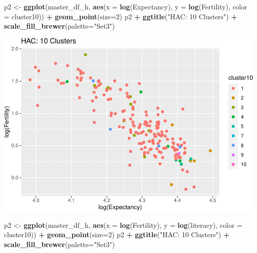 \documentclass[]{article}
\newenvironment{Shaded}{\begin{snugshade}}{\end{snugshade}}
\newcommand{\DataTypeTok}[1]{\textcolor[rgb]{0.13,0.29,0.53}{#1}}
\newcommand{\DecValTok}[1]{\textcolor[rgb]{0.00,0.00,0.81}{#1}}
\newcommand{\KeywordTok}[1]{\textcolor[rgb]{0.13,0.29,0.53}{\textbf{#1}}}
\newcommand{\NormalTok}[1]{#1}
\newcommand{\OperatorTok}[1]{\textcolor[rgb]{0.81,0.36,0.00}{\textbf{#1}}}
\newcommand{\StringTok}[1]{\textcolor[rgb]{0.31,0.60,0.02}{#1}}
\begin{document}
\begin{Shaded}
\begin{Highlighting}[]
\NormalTok{p2 <-}\StringTok{ }\KeywordTok{ggplot}\NormalTok{(master_df_h, }\KeywordTok{aes}\NormalTok{(}\DataTypeTok{x =} \KeywordTok{log}\NormalTok{(Expectancy), }\DataTypeTok{y =} \KeywordTok{log}\NormalTok{(Fertility), }\DataTypeTok{color =}\NormalTok{ cluster10)) }\OperatorTok{+}
\StringTok{  }\KeywordTok{geom_point}\NormalTok{(}\DataTypeTok{size=}\DecValTok{2}\NormalTok{)}
\NormalTok{p2 }\OperatorTok{+}\StringTok{ }\KeywordTok{ggtitle}\NormalTok{(}\StringTok{"HAC: 10 Clusters"}\NormalTok{) }\OperatorTok{+}\StringTok{ }\KeywordTok{scale_fill_brewer}\NormalTok{(}\DataTypeTok{palette=}\StringTok{"Set3"}\NormalTok{)}
\end{Highlighting}
\end{Shaded}

\includegraphics{eda_files/figure-latex/unnamed-chunk-31-9.pdf}

\begin{Shaded}
\begin{Highlighting}[]
\NormalTok{p2 <-}\StringTok{ }\KeywordTok{ggplot}\NormalTok{(master_df_h, }\KeywordTok{aes}\NormalTok{(}\DataTypeTok{x =} \KeywordTok{log}\NormalTok{(Fertility), }\DataTypeTok{y =} \KeywordTok{log}\NormalTok{(literacy), }\DataTypeTok{color =}\NormalTok{ cluster10)) }\OperatorTok{+}
\StringTok{  }\KeywordTok{geom_point}\NormalTok{(}\DataTypeTok{size=}\DecValTok{2}\NormalTok{)}
\NormalTok{p2 }\OperatorTok{+}\StringTok{ }\KeywordTok{ggtitle}\NormalTok{(}\StringTok{"HAC: 10 Clusters"}\NormalTok{) }\OperatorTok{+}\StringTok{ }\KeywordTok{scale_fill_brewer}\NormalTok{(}\DataTypeTok{palette=}\StringTok{"Set3"}\NormalTok{)}
\end{Highlighting}
\end{Shaded}
\end{document}
